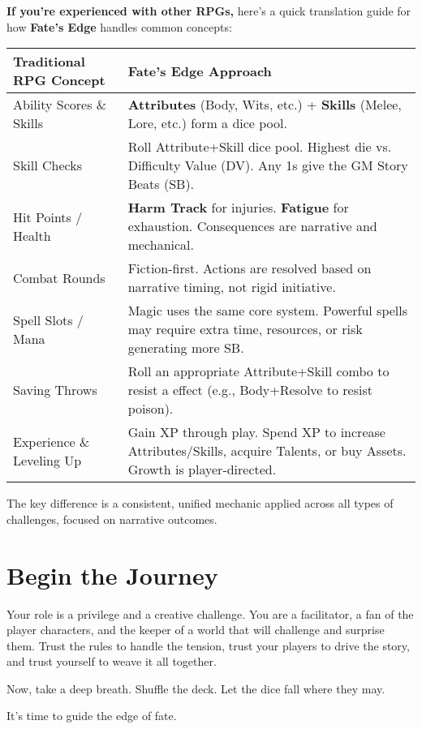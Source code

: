 \begin{tcolorbox}[enhanced, sharp corners, boxrule=1pt, colback=blue!5!white, colframe=blue!75!black, title={A Guide for Veterans: Fate's Edge in a Nutshell}]
\textbf{If you're experienced with other RPGs,} here’s a quick translation guide for how \textbf{Fate's Edge} handles common concepts:

\begin{center}
\begin{tabular}{|p{6cm}|p{6cm}|}
\hline
\textbf{Traditional RPG Concept} & \textbf{Fate's Edge Approach} \\
\hline
Ability Scores \& Skills & \textbf{Attributes} (Body, Wits, etc.) + \textbf{Skills} (Melee, Lore, etc.) form a dice pool. \\
\hline
Skill Checks & Roll Attribute+Skill dice pool. Highest die vs. Difficulty Value (DV). Any 1s give the GM Story Beats (SB). \\
\hline
Hit Points / Health & \textbf{Harm Track} for injuries. \textbf{Fatigue} for exhaustion. Consequences are narrative and mechanical. \\
\hline
Combat Rounds & Fiction-first. Actions are resolved based on narrative timing, not rigid initiative. \\
\hline
Spell Slots / Mana & Magic uses the same core system. Powerful spells may require extra time, resources, or risk generating more SB. \\
\hline
Saving Throws & Roll an appropriate Attribute+Skill combo to resist a effect (e.g., Body+Resolve to resist poison). \\
\hline
Experience \& Leveling Up & Gain XP through play. Spend XP to increase Attributes/Skills, acquire Talents, or buy Assets. Growth is player-directed. \\
\hline
\end{tabular}
\end{center}

The key difference is a consistent, unified mechanic applied across all types of challenges, focused on narrative outcomes.
\end{tcolorbox}

\section*{Begin the Journey}

Your role is a privilege and a creative challenge. You are a facilitator, a fan of the player characters, and the keeper of a world that will challenge and surprise them. Trust the rules to handle the tension, trust your players to drive the story, and trust yourself to weave it all together.

Now, take a deep breath. Shuffle the deck. Let the dice fall where they may.

It's time to guide the edge of fate.


